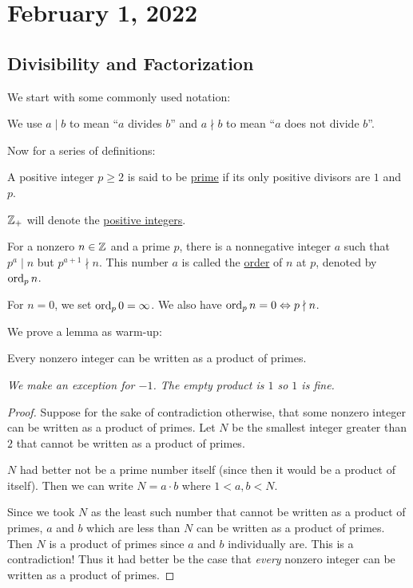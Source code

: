 \section{February 1, 2022}

\subsection{Divisibility and Factorization}
We start with some commonly used notation:
\begin{definition}[Divisibility]
    We use $a\mid b$ to mean ``$a$ divides $b$'' and $a\nmid b$ to mean ``$a$ does not divide $b$''.
\end{definition}

Now for a series of definitions:

\begin{definition}[Primality]
    A positive integer $p\geq 2$ is said to be \ul{prime} if its only positive divisors are $1$ and $p$.
\end{definition}

\begin{definition}
    $\mathbb Z_+$ will denote the \ul{positive integers}.
\end{definition}

\begin{definition}[Order]
    For a nonzero $n\in \mathbb Z$ and a prime $p$, there is a nonnegative integer $a$ such that $p^a\mid n$ but $p^{a + 1}\nmid n$. This number $a$ is called the \ul{order} of $n$ at $p$, denoted by $\operatorname{ord}_p n$.

    For $n=0$, we set $\operatorname{ord}_p 0 = \infty$. We also have $\operatorname{ord}_p n = 0\Leftrightarrow p\nmid n$.
\end{definition}

We prove a lemma as warm-up:
\begin{lemma}
    Every nonzero integer can be written as a product of primes.

    \emph{We make an exception for $-1$. The empty product is $1$ so $1$ is fine.}
\end{lemma}
\begin{proof}
    Suppose for the sake of contradiction otherwise, that some nonzero integer can be written as a product of primes. Let $N$ be the smallest integer greater than $2$ that cannot be written as a product of primes.

    $N$ had better not be a prime number itself (since then it would be a product of itself). Then we can write $N = a\cdot b$ where $1 < a, b < N$.

    Since we took $N$ as the least such number that cannot be written as a product of primes, $a$ and $b$ which are less than $N$ can be written as a product of primes. Then $N$ is a product of primes since $a$ and $b$ individually are. This is a contradiction! Thus it had better be the case that \emph{every} nonzero integer can be written as a product of primes.
\end{proof}

